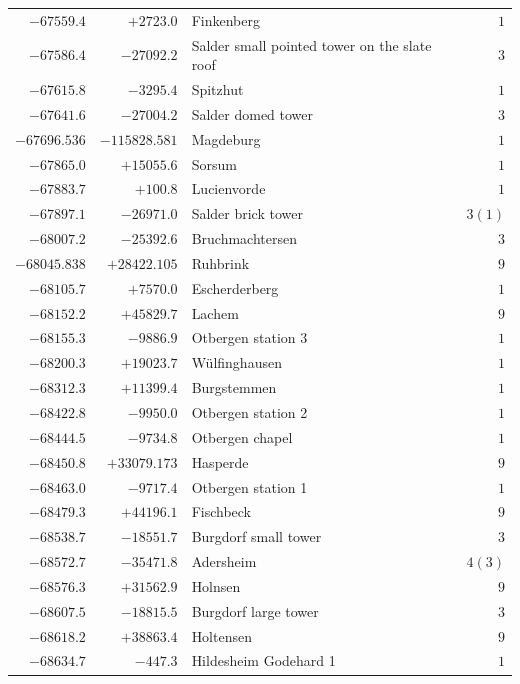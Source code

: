 \begin{center}
\begin{tabular}{r|r|p{170pt}|r}
\(-67559.4\)&\(+2723.0\)&Finkenberg&\(1\)\\
\(-67586.4\)&\(-27092.2\)&Salder small pointed tower on the slate roof&\(3\)\\
\(-67615.8\)&\(-3295.4\)&Spitzhut&\(1\)\\
\(-67641.6\)&\(-27004.2\)&Salder domed tower&\(3\)\\
\(-67696.536\)&\(-115828.581\)&Magdeburg&\(1\)\\
\(-67865.0\)&\(+15055.6\)&Sorsum&\(1\)\\
\(-67883.7\)&\(+100.8\)&Lucienvorde&\(1\)\\
\(-67897.1\)&\(-26971.0\)&Salder brick tower&\(3 (1)\)\\
\(-68007.2\)&\(-25392.6\)&Bruchmachtersen&\(3\)\\
\(-68045.838\)&\(+28422.105\)&Ruhbrink&\(9\)\\
\(-68105.7\)&\(+7570.0\)&Escherderberg&\(1\)\\
\(-68152.2\)&\(+45829.7\)&Lachem&\(9\)\\
\(-68155.3\)&\(-9886.9\)&Otbergen station 3&\(1\)\\
\(-68200.3\)&\(+19023.7\)&Wülfinghausen&\(1\)\\
\(-68312.3\)&\(+11399.4\)&Burgstemmen&\(1\)\\
\(-68422.8\)&\(-9950.0\)&Otbergen station 2&\(1\)\\
\(-68444.5\)&\(-9734.8\)&Otbergen chapel&\(1\)\\
\(-68450.8\)&\(+33079.173\)&Hasperde&\(9\)\\
\(-68463.0\)&\(-9717.4\)&Otbergen station 1&\(1\)\\
\(-68479.3\)&\(+44196.1\)&Fischbeck&\(9\)\\
\(-68538.7\)&\(-18551.7\)&Burgdorf small tower&\(3\)\\
\(-68572.7\)&\(-35471.8\)&Adersheim&\(4 (3)\)\\
\(-68576.3\)&\(+31562.9\)&Holnsen&\(9\)\\
\(-68607.5\)&\(-18815.5\)&Burgdorf large tower&\(3\)\\
\(-68618.2\)&\(+38863.4\)&Holtensen&\(9\)\\
\(-68634.7\)&\(-447.3\)&Hildesheim Godehard 1&\(1\)\\
\hline\end{tabular}\endgroup\end{center}
